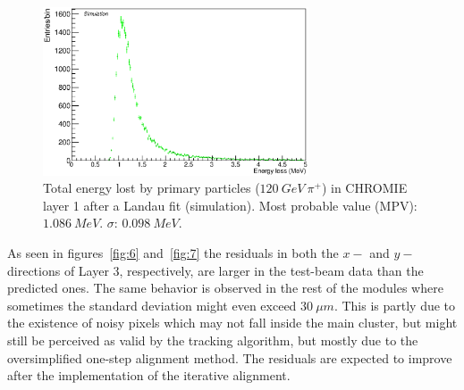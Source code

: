 \documentclass[a4paper,11pt]{article}
\begin{document}
\begin{figure}[htbp]
	\centering %
	\includegraphics[width=0.7\textwidth,origin=c,angle=0]{total_energy_Landau_layer_1.eps}
	\caption{\label{fig:5} Total energy lost by primary particles ($120\: GeV\: \pi^{+}$) in CHROMIE layer 1 after a Landau fit (simulation). Most probable value (MPV): $1.086\: MeV$. $\sigma$: $0.098\: MeV$.}
\end{figure}

As seen in figures~\ref{fig:6} and~\ref{fig:7} the residuals in both the $x-$ and $y-$ directions of Layer 3, respectively, are larger in the test-beam data than the predicted ones. The same behavior is observed in the rest of the modules where sometimes the standard deviation might even exceed $30\: \mu m$. This is partly due to the existence of noisy pixels which may not fall inside the main cluster, but might still be perceived as valid by the tracking algorithm, but mostly due to the oversimplified one-step alignment method. The residuals are expected to improve after the implementation of the iterative alignment.
\end{document}
